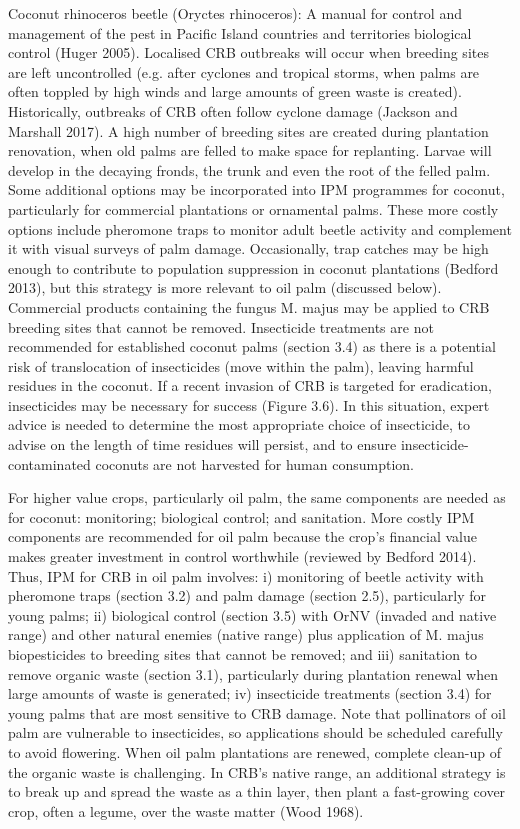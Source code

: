 \documentclass[twocolumn,letterpaper]{scrartcl}
\begin{document}
Coconut rhinoceros beetle (Oryctes rhinoceros): A manual for control and management of the pest in Pacific Island countries and territoriesbiological control (Huger 2005). Localised CRB outbreaks will occur when breeding sites are left uncontrolled 
(e.g. after cyclones and tropical storms, when palms are often toppled by high winds and large amounts of 
green waste is created). Historically, outbreaks of CRB often follow cyclone damage (Jackson and Marshall 2017). 
A high number of breeding sites are created during plantation renovation, when old palms are felled to make 
space for replanting. Larvae will develop in the decaying fronds, the trunk and even the root of the felled palm. 
Some additional options may be incorporated into IPM programmes for coconut, particularly for commercial 
plantations or ornamental palms. These more costly options include pheromone traps to monitor adult beetle 
activity and complement it with visual surveys of palm damage. Occasionally, trap catches may be high enough 
to  contribute  to  population  suppression  in  coconut  plantations  (Bedford  2013),  but  this  strategy  is  more 
relevant to oil palm (discussed below). Commercial products containing the fungus M. majus may be applied 
to CRB breeding sites that cannot be removed. Insecticide treatments are not recommended for established 
coconut palms (section 3.4) as there is a potential risk of translocation of insecticides (move within the palm), 
leaving harmful residues in the coconut. If a recent invasion of CRB is targeted for eradication, insecticides 
may  be  necessary  for  success  (Figure  3.6).  In  this  situation,  expert  advice  is  needed  to  determine  the  most 
appropriate choice of insecticide, to advise on the length of time residues will persist, and to ensure insecticide-
contaminated coconuts are not harvested for human consumption. 

For higher value crops, particularly oil palm, the same components are needed as for coconut: monitoring; 
biological control; and sanitation. More costly IPM components are recommended for oil palm because the 
crop’s financial value makes greater investment in control worthwhile (reviewed by Bedford 2014). Thus, IPM for 
CRB in oil palm involves: i) monitoring of beetle activity with pheromone traps (section 3.2) and palm damage 
(section 2.5), particularly for young palms; ii) biological control (section 3.5) with OrNV (invaded and native 
range) and other natural enemies (native range) plus application of M. majus biopesticides to breeding sites 
that cannot be removed; and iii) sanitation to remove organic waste (section 3.1), particularly during plantation 
renewal when large amounts of waste is generated; iv) insecticide treatments (section 3.4) for young palms that 
are most sensitive to CRB damage. Note that pollinators of oil palm are vulnerable to insecticides, so applications 
should be scheduled carefully to avoid flowering. When oil palm plantations are renewed, complete clean-up 
of the organic waste is challenging. In CRB’s native range, an additional strategy is to break up and spread the 
waste as a thin layer, then plant a fast-growing cover crop, often a legume, over the waste matter (Wood 1968). 
\end{document}
